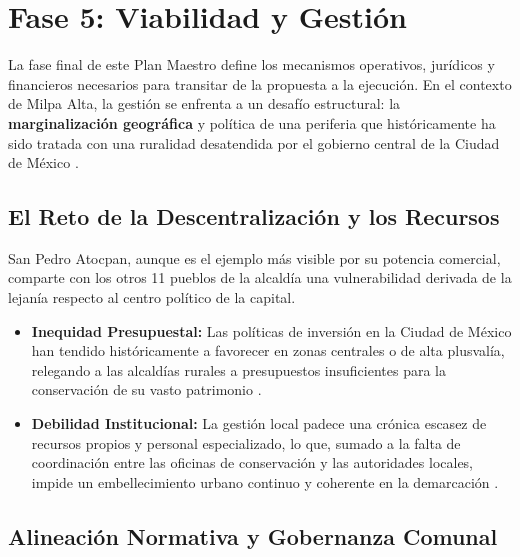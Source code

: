 \section{Fase 5: Viabilidad y Gestión}
\label{sec:viabilidad-gestion}

La fase final de este Plan Maestro define los mecanismos operativos, jurídicos 
y financieros necesarios para transitar de la propuesta a la ejecución. 
En el contexto de Milpa Alta, la gestión se enfrenta a un desafío 
estructural: la \textbf{marginalización geográfica} y política de una 
periferia que históricamente ha sido tratada con una ruralidad desatendida 
por el gobierno central de la Ciudad de México \cite{milpaalta2017pddu}.

\subsection{El Reto de la Descentralización y los Recursos}
\label{ssec:reto-descentralizacion}

San Pedro Atocpan, aunque es el ejemplo más visible por su potencia comercial, 
comparte con los otros 11 pueblos de la alcaldía una vulnerabilidad derivada de 
la lejanía respecto al centro político de la capital. 

\begin{itemize}
    \item \textbf{Inequidad Presupuestal:} Las políticas de inversión en la 
        Ciudad de México han tendido históricamente a favorecer 
         en zonas centrales o de alta 
        plusvalía, relegando a las alcaldías rurales a presupuestos 
        insuficientes para la conservación de su vasto 
        patrimonio \cite{balandrano2016conservacion}. 
    \item \textbf{Debilidad Institucional:} La gestión local padece 
        una crónica escasez de recursos propios y personal especializado, 
        lo que, sumado a la falta de coordinación entre las oficinas de 
        conservación y las autoridades locales, impide un embellecimiento 
        urbano continuo y coherente en la demarcación \cite{balandrano2016conservacion}.
\end{itemize}

\subsection{Alineación Normativa y Gobernanza Comunal}
\label{ssec:alineacion-normativa-gobernanza}

